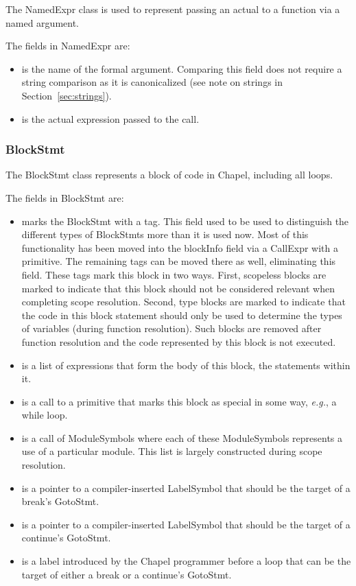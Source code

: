 \documentclass[10pt]{article}
\newcommand{\eg}{\emph{e.g.}}
\begin{document}
The NamedExpr class is used to represent passing an actual to a
function via a named argument.

The fields in NamedExpr are:
\begin{itemize}
\item {} is the name of the formal argument.
  Comparing this field does not require a string comparison as it is
  canonicalized (see note on strings in Section~\ref{sec:strings}).
\item {} is the actual expression passed to the call.
\end{itemize}

\subsubsection{BlockStmt}
\label{sec:blockstmt}

The BlockStmt class represents a block of code in Chapel, including
all loops.

The fields in BlockStmt are:
\begin{itemize}
\item {} marks the BlockStmt with a tag.  This
  field used to be used to distinguish the different types of
  BlockStmts more than it is used now.  Most of this functionality has
  been moved into the blockInfo field via a CallExpr with a primitive.
  The remaining tags can be moved there as well, eliminating this
  field.  These tags mark this block in two ways.  First, scopeless
  blocks are marked to indicate that this block should not be
  considered relevant when completing scope resolution.  Second, type
  blocks are marked to indicate that the code in this block statement
  should only be used to determine the types of variables (during
  function resolution).  Such blocks are removed after function
  resolution and the code represented by this block is not executed.
\item {} is a list of expressions that form the body of
  this block, the statements within it.
\item {} is a call to a primitive that marks
  this block as special in some way, \eg, a while loop.
\item {} is a call of ModuleSymbols where each of
  these ModuleSymbols represents a use of a particular module.  This
  list is largely constructed during scope resolution.
\item {} is a pointer to a compiler-inserted
  LabelSymbol that should be the target of a break's GotoStmt.
\item {} is a pointer to a
  compiler-inserted LabelSymbol that should be the target of a
  continue's GotoStmt.
\item {} is a label introduced by the Chapel
  programmer before a loop that can be the target of either a break or
  a continue's GotoStmt.
\end{itemize}
\end{document}

